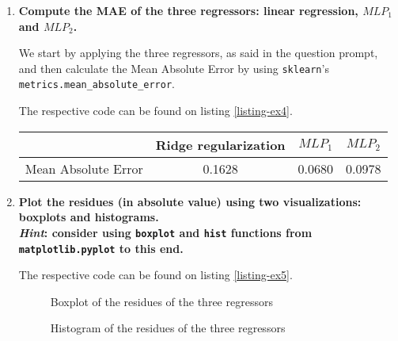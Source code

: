 \documentclass[12pt]{article}
\begin{document}
\begin{enumerate}[leftmargin=\labelsep,resume]
    \item {\color{questioncolor}\bfseries
          Compute the MAE of the three regressors: linear regression, $MLP_1$ and $MLP_2$.
          }\\
          \vspace{0.5em}

          We start by applying the three regressors, as said in the question prompt,
          and then calculate the Mean Absolute Error by using \texttt{sklearn}'s
          \texttt{metrics.mean\_absolute\_error}.

          The respective code can be found on listing \ref{listing-ex4}.

          \begin{center}
              \captionsetup{type=table}
              \begin{tabular}{c|c|c|c}
                                      & Ridge regularization & $MLP_1$ & $MLP_2$ \\
                  \hline
                  Mean Absolute Error & 0.1628               & 0.0680  & 0.0978
              \end{tabular}
          \end{center}


    \item {\color{questioncolor}\bfseries
          Plot the residues (in absolute value) using two visualizations: boxplots
          and histograms.\\
          \textit{Hint}: consider using \texttt{boxplot} and \texttt{hist} functions
          from \texttt{matplotlib.pyplot} to this end.
          }\\
          \vspace{0.5em}

          The respective code can be found on listing \ref{listing-ex5}.

          \begin{figure}[H]
              \centering
              
              \caption{Boxplot of the residues of the three regressors}
              \label{fig:bloxplot}
          \end{figure}

          \begin{figure}[H]
              \centering
              
              \caption{Histogram of the residues of the three regressors}
              \label{fig:histogram}
          \end{figure}


\end{enumerate}
\end{document}
